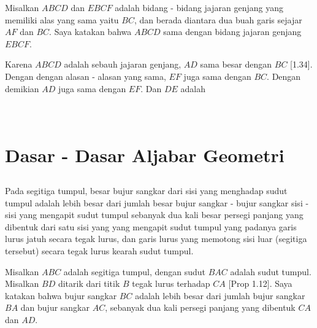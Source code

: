 \documentclass[a4paper, 12pt]{book}
\begin{document}

Misalkan $ABCD$ dan $EBCF$ adalah bidang - bidang jajaran genjang yang memiliki alas yang sama yaitu $BC$, 
dan berada diantara dua buah garis sejajar $AF$ dan $BC$. Saya katakan bahwa $ABCD$ sama dengan bidang
jajaran genjang $EBCF$.  

Karena $ABCD$ adalah sebauh jajaran genjang, $AD$ sama besar dengan $BC$ [1.34]. Dengan dengan alasan - alasan
yang sama, $EF$ juga sama dengan $BC$. Dengan demikian $AD$ juga sama dengan $EF$. Dan $DE$ adalah 

\setcounter{chapter}{2}
\chapter*{\centering \chaptername{ \thechapter} \\Dasar - Dasar Aljabar Geometri}
\setcounter{section}{12}
\section*{\centering \thesection} 

Pada segitiga tumpul, besar bujur sangkar dari sisi yang menghadap sudut tumpul
 adalah lebih besar dari jumlah besar bujur sangkar - bujur sangkar sisi - sisi yang 
mengapit sudut tumpul sebanyak dua kali besar persegi panjang yang dibentuk
dari satu sisi yang yang mengapit sudut tumpul yang padanya garis lurus jatuh
secara tegak lurus, dan garis lurus yang memotong sisi luar (segitiga tersebut) secara tegak lurus 
kearah sudut tumpul.


Misalkan $ABC$ adalah segitiga tumpul, dengan sudut $BAC$ adalah sudut tumpul.
Misalkan $BD$ ditarik dari titik $B$ tegak lurus terhadap $CA$ [Prop 1.12]. Saya
katakan bahwa bujur sangkar $BC$ adalah lebih besar dari jumlah bujur sangkar $BA$
dan bujur sangkar $AC$, sebanyak dua kali persegi panjang yang dibentuk $CA$ dan $AD$.
\end{document}

